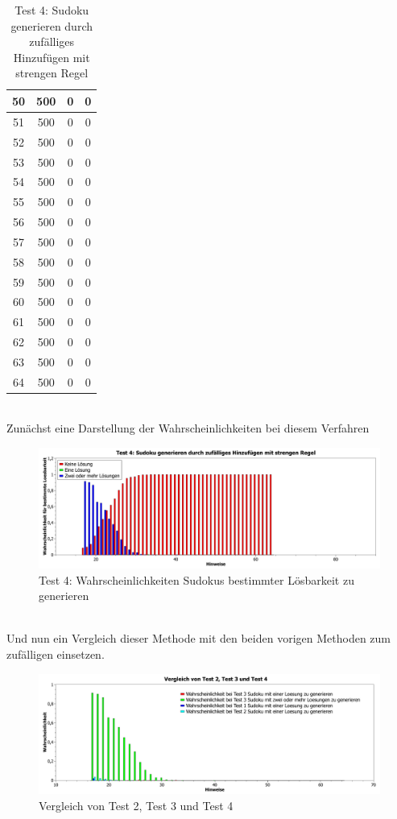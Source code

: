 \documentclass[11pt,a4paper]{article}
\begin{document}
\begin{table}[htbp!]
\begin{center}
\begin{tabular}{|*{4}{c|}}
 50 & 500 & 0 & 0 \\ \hline 
 51 & 500 & 0 & 0 \\ \hline 
 52 & 500 & 0 & 0 \\ \hline 
 53 & 500 & 0 & 0 \\ \hline 
 54 & 500 & 0 & 0 \\ \hline 
 55 & 500 & 0 & 0 \\ \hline 
 56 & 500 & 0 & 0 \\ \hline 
 57 & 500 & 0 & 0 \\ \hline 
 58 & 500 & 0 & 0 \\ \hline 
 59 & 500 & 0 & 0 \\ \hline 
 60 & 500 & 0 & 0 \\ \hline 
 61 & 500 & 0 & 0 \\ \hline 
 62 & 500 & 0 & 0 \\ \hline 
 63 & 500 & 0 & 0 \\ \hline 
 64 & 500 & 0 & 0 \\ \hline  
 \end{tabular}
 \end{center}
  \caption{Test 4: Sudoku generieren durch zufälliges Hinzufügen mit strengen Regel} 
\end{table}
\ \\ 
Zunächst eine Darstellung der Wahrscheinlichkeiten bei diesem Verfahren
\newpage
\begin{figure}[htbp!]
\begin{center}
\includegraphics[width=1\textwidth]{test4.pdf}
\end{center}
\caption{Test 4: Wahrscheinlichkeiten Sudokus bestimmter Lösbarkeit zu generieren}
\end{figure}
\ \\  
Und nun ein Vergleich dieser Methode mit den beiden vorigen Methoden zum zufälligen einsetzen.
\ \\
\begin{figure}[htbp!]
\begin{center}
\includegraphics[width=1\textwidth]{vergTest234.pdf}
\end{center}
\caption{Vergleich von Test 2, Test 3 und Test 4}
\end{figure}
\end{document}
